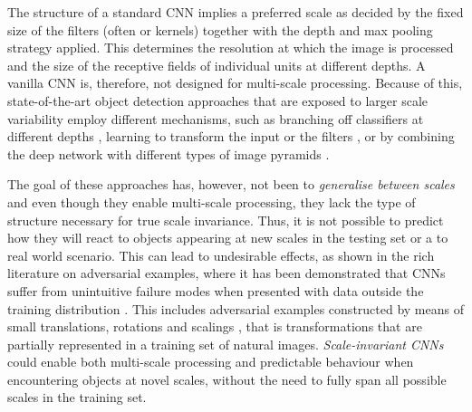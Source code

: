 \documentclass[twocolumn,runningheads]{svjour3}
\begin{document}
The structure of a standard CNN implies a preferred scale as decided by
the fixed size of the filters (often  or 
kernels) together with the depth and max pooling strategy
applied. This determines the resolution at which the image is
processed and the size of the receptive fields of individual units at
different depths.
A vanilla CNN is, therefore, not designed for multi-scale
processing. Because of this, state-of-the-art object detection
approaches that are exposed to larger scale variability employ different mechanisms, such as
branching off classifiers at different depths
\cite{SerLeC11-IJCNN,CaiFanFerVas16-ECCV}, learning to transform the
input or the filters \cite{JadSimZisKav15-NIPS,LinLuc17-CVPR,HenVed17-ICML}, or
by combining the deep network with different types of image pyramids
\cite{SerEigZhaMatFerLeC13-arXiv,Gir15-ICCV,LinDolGirHeHarBel17-CVPR,LinGoyGirHeDol17-ICCV,HeKiDolGir17-ICCV,HuRam17-CVPR}. 

The goal of these approaches has, however, not been to {\em generalise between scales\/} 
and even though they enable multi-scale processing, they lack the type
of structure necessary for true scale invariance.
Thus, it is not possible to predict how they will react to objects
appearing at new scales in the testing set or a to real world
scenario. This can lead to undesirable effects, as shown in the rich
literature on adversarial examples, where it has been demonstrated
that CNNs suffer from unintuitive failure modes when presented with
data outside the training distribution
\cite{SzeZarSutBruErhGooFer13-arXiv,NguYoClu15-CVPR,MooFawFro16-CVPR,TanGri16-arXiv,SuVarKou17-arXiv,MooFawFawFro17-CVPR,BakLuErlKel18-CompBiol}.
This includes adversarial examples constructed by means of small
translations, rotations and scalings
\cite{EngTraTsiSchMad17-arXiv,FawFro15-BMVC}, that is transformations
that are partially represented in a training set of natural
images. {\em Scale-invariant CNNs\/} could enable both multi-scale
processing and predictable behaviour when encountering objects at
novel scales, without the need to fully span all possible scales in
the training set. 
\end{document}
